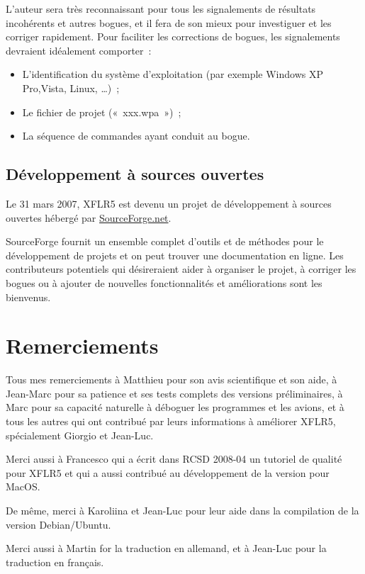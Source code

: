 \documentclass[a4paper,twoside,12pt,dvips]{article}
\begin{document}
L’auteur sera très reconnaissant pour tous les signalements de résultats incohérents et autres bogues, et il fera de son mieux pour investiguer et les
corriger rapidement. Pour faciliter les corrections de bogues, les signalements
devraient idéalement comporter~: 

\begin{itemize}
	\item L’identification du système d’exploitation (par exemple Windows XP
	Pro,Vista, Linux, \dots)~;
	\item Le fichier de projet («~xxx.wpa~»)~;
	\item La séquence de commandes ayant conduit au bogue.
\end{itemize}

\subsection{Développement à sources ouvertes}

Le 31 mars 2007, XFLR5 est devenu un projet de développement à sources 
ouvertes hébergé par \href{https://sourceforge.net/projects/xflr5/}
{SourceForge.net}.

SourceForge fournit un ensemble complet d’outils et de méthodes pour le développement de projets et on peut trouver une documentation en ligne. Les contributeurs potentiels qui désireraient aider à organiser le projet, à corriger les bogues ou à ajouter de nouvelles fonctionnalités et améliorations sont les bienvenus.

\section{Remerciements}

Tous mes remerciements à Matthieu pour son avis scientifique et son aide, à Jean-Marc pour sa patience et ses tests complets des versions préliminaires, à Marc pour sa capacité naturelle à déboguer les programmes et les avions, et à tous les autres qui ont contribué par leurs informations à améliorer XFLR5, spécialement Giorgio et Jean-Luc.

Merci aussi à Francesco qui a écrit dans RCSD 2008-04 un tutoriel de qualité pour XFLR5 et qui a aussi contribué au développement de la version pour MacOS.

De même, merci à Karoliina et Jean-Luc pour leur aide dans la compilation de la version Debian/Ubuntu.

Merci aussi à Martin for la traduction en allemand, et à Jean-Luc pour la traduction en français.

\clearpage

\nocite{*}
 


\clearpage
\listoffigures

\clearpage
\listoftables
\end{document}
